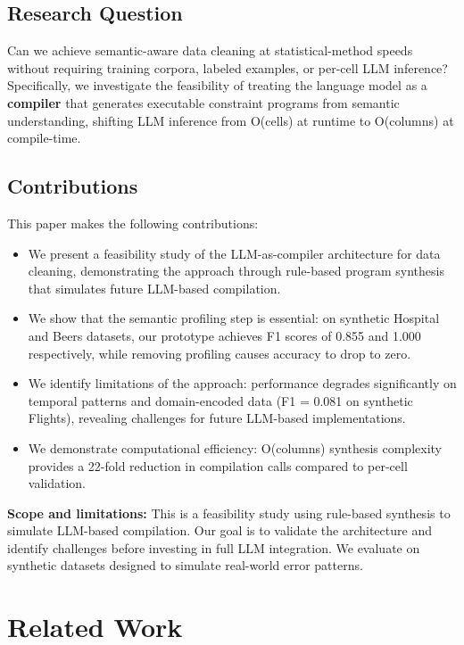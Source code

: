 \documentclass{article}
\begin{document}
\subsection{Research Question}

Can we achieve semantic-aware data cleaning at statistical-method speeds without requiring training corpora, labeled examples, or per-cell LLM inference? Specifically, we investigate the feasibility of treating the language model as a \textbf{compiler} that generates executable constraint programs from semantic understanding, shifting LLM inference from O(cells) at runtime to O(columns) at compile-time.

\subsection{Contributions}

This paper makes the following contributions:
\begin{itemize}
    \item We present a feasibility study of the LLM-as-compiler architecture for data cleaning, demonstrating the approach through rule-based program synthesis that simulates future LLM-based compilation.
    \item We show that the semantic profiling step is essential: on synthetic Hospital and Beers datasets, our prototype achieves F1 scores of 0.855 and 1.000 respectively, while removing profiling causes accuracy to drop to zero.
    \item We identify limitations of the approach: performance degrades significantly on temporal patterns and domain-encoded data (F1 = 0.081 on synthetic Flights), revealing challenges for future LLM-based implementations.
    \item We demonstrate computational efficiency: O(columns) synthesis complexity provides a 22-fold reduction in compilation calls compared to per-cell validation.
\end{itemize}

\textbf{Scope and limitations:} This is a feasibility study using rule-based synthesis to simulate LLM-based compilation. Our goal is to validate the architecture and identify challenges before investing in full LLM integration. We evaluate on synthetic datasets designed to simulate real-world error patterns.

\section{Related Work}
\label{sec:related}
\end{document}
